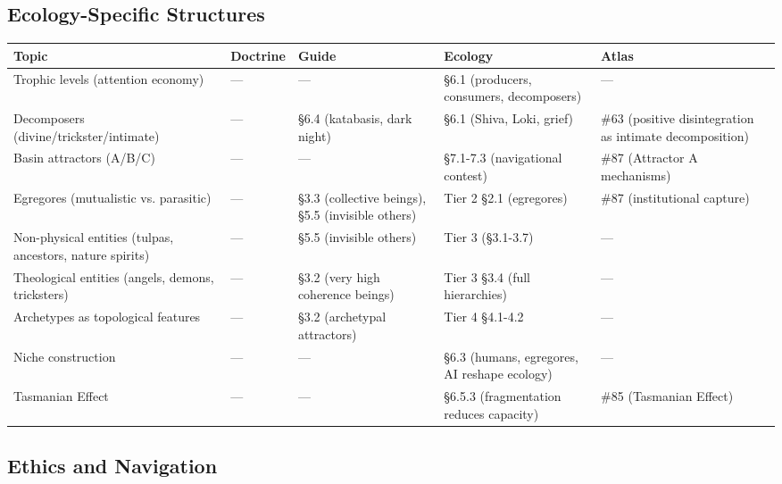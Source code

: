 \subsection*{Ecology-Specific Structures}



\begin{longtable}{p{} p{} p{} p{} p{}}
\toprule
\textbf{Topic} & \textbf{Doctrine} & \textbf{Guide} & \textbf{Ecology} & \textbf{Atlas} \\
\midrule
\endhead
Trophic levels (attention economy) & — & — & §6.1 (producers, consumers, decomposers) & — \\
Decomposers (divine/trickster/intimate) & — & §6.4 (katabasis, dark night) & §6.1 (Shiva, Loki, grief) & \#63 (positive disintegration as intimate decomposition) \\
Basin attractors (A/B/C) & — & — & §7.1-7.3 (navigational contest) & \#87 (Attractor A mechanisms) \\
Egregores (mutualistic vs. parasitic) & — & §3.3 (collective beings), §5.5 (invisible others) & Tier 2 §2.1 (egregores) & \#87 (institutional capture) \\
Non-physical entities (tulpas, ancestors, nature spirits) & — & §5.5 (invisible others) & Tier 3 (§3.1-3.7) & — \\
Theological entities (angels, demons, tricksters) & — & §3.2 (very high coherence beings) & Tier 3 §3.4 (full hierarchies) & — \\
Archetypes as topological features & — & §3.2 (archetypal attractors) & Tier 4 §4.1-4.2 & — \\
Niche construction & — & — & §6.3 (humans, egregores, AI reshape ecology) & — \\
Tasmanian Effect & — & — & §6.5.3 (fragmentation reduces capacity) & \#85 (Tasmanian Effect) \\
\bottomrule
\end{longtable}



\subsection*{Ethics and Navigation}



